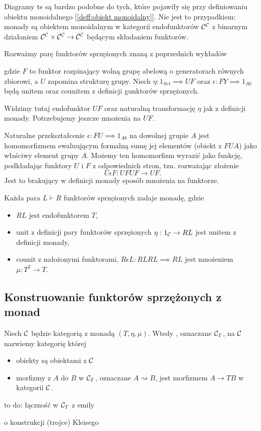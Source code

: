 Diagramy te są bardzo podobne do tych, które pojawiły się przy definiowaniu obiektu monoidalnego [\ref{deff:obiekt monoidalny}]. Nie jest to przypadkiem: monady są obiektem monoidalnym w kategorii endofunktorów $\mathcal{C}^{\mathcal{C}}$ z binarnym działaniem $\mathcal{C}^{\mathcal{C}}\times\mathcal{C}^{\mathcal{C}}\to \mathcal{C}^{\mathcal{C}}$ będącym składaniem funktorów.

\begin{example}
  Rozważmy parę funktorów sprzężonych znaną z poprzednich wykładów
  \begin{center}
  \end{center}
  gdzie $F$ to funktor rozpinający wolną grupę abelową o generatorach równych zbiorowi, a $U$ zapomina strukturę grupy. Niech $\eta:1_{Set}\implies UF$ oraz $\epsilon:FY\implies 1_{Ab}$ będą unitem oraz counitem z definicji gunktorów sprzężonych.

  Widzimy tutaj endofunktor $UF$ oraz naturalną transformację $\eta$ jak z definicji monady. Potrzebujemy jeszcze mnożenia na $UF$.

  Naturalne przekształcenie $\epsilon:FU\implies 1_{Ab}$ na dowolnej grupie $A$ jest homomorfizmem ewaluującym formalną sumę jej elementów (obiekt z $FUA$) jako właściwy element grupy $A$. Możemy ten homomorfizm wyrazić jako funkcję, podkładając funktory $U$ i $F$ z odpowiednich stron, tzn. rozważając złożenie
  $$U\epsilon F:UFUF\to UF.$$
  Jest to brakujący w definicji monady sposób mnożenia na funktorze.
\end{example}

\begin{lemma}{}{}
  Każda para $L\vdash R$ funktorów sprzężonych zadaje monadę, gdzie
  \begin{itemize}
    \item $RL$ jest endofunktorem $T$,
    \item unit z definicji pary funktorów sprzężonych $\eta:1_{\mathcal{C}}\to RL$ jest unitem z definicji monady,
    \item counit z nałożonymi funktorami, $R\epsilon L:RLRL\implies RL$ jest mnożeniem $\mu:T^2\to T$.
  \end{itemize}
\end{lemma}

\subsection{Konstruowanie funktorów sprzężonych z monad}
\begin{definition}{}{}
  Niech $\mathcal{C}$ będzie kategorią z monadą $(T, \eta, \mu)$. Wtedy , oznaczane $\mathcal{C}_T$, na $\mathcal{C}$ nazwiemy kategorię której
  \begin{itemize}
    \item obiekty są obiektami z $\mathcal{C}$ 
    \item morfizmy z $A$ do $B$ w $\mathcal{C}_T$, oznaczane $A\rightsquigarrow B$, jest morfizmem $A\to TB$ w kategorii $\mathcal{C}$.
  \end{itemize}
\end{definition}

\begin{lemma}{}{}
  to do: łączność w $\mathcal{C}_T$ z emily
\end{lemma}

o konstrukcji (trojce) Kleisego





